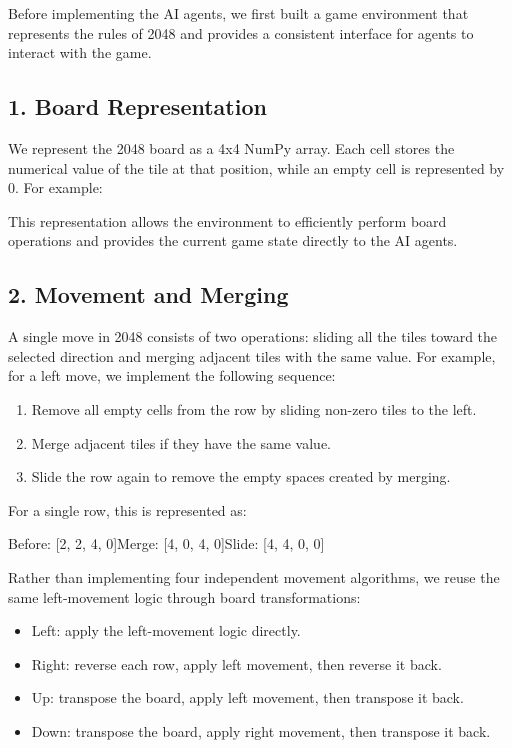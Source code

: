\documentclass[10pt]{article}
\begin{document}
Before implementing the AI agents, we first built a game environment that represents the rules of 2048 and provides a consistent interface for agents to interact with the game.

\subsection*{1. Board Representation}

We represent the 2048 board as a 4x4 NumPy array. Each cell stores the numerical value of the tile at that position, while an empty cell is represented by 0. For example:

\begin{center}
\ttfamily
[0, 2, 0, 0]\quad [0, 0, 0, 0]\quad [0, 0, 4, 0]\quad [2, 0, 0, 0]
\end{center}

This representation allows the environment to efficiently perform board operations and provides the current game state directly to the AI agents.

\subsection*{2. Movement and Merging}

A single move in 2048 consists of two operations: sliding all the tiles toward the selected direction and merging adjacent tiles with the same value. For example, for a left move, we implement the following sequence:

\begin{enumerate}
  \item Remove all empty cells from the row by sliding non-zero tiles to the left.
  \item Merge adjacent tiles if they have the same value.
  \item Slide the row again to remove the empty spaces created by merging.
\end{enumerate}

For a single row, this is represented as:

\begin{center}
\ttfamily Before: [2, 2, 4, 0]\quad Merge: [4, 0, 4, 0]\quad Slide: [4, 4, 0, 0]
\end{center}

Rather than implementing four independent movement algorithms, we reuse the same left-movement logic through board transformations:

\begin{itemize}
  \item Left: apply the left-movement logic directly.
  \item Right: reverse each row, apply left movement, then reverse it back.
  \item Up: transpose the board, apply left movement, then transpose it back.
  \item Down: transpose the board, apply right movement, then transpose it back.
\end{itemize}
\end{document}
